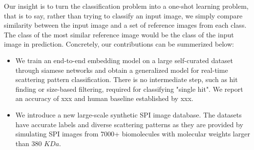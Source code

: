 Our insight is to turn the classification problem into a one-shot learning
problem, that is to say, rather than trying to classify an input image, we
simply compare similarity between the input image and a set of reference images
from each class.  The class of the most similar reference image would be the
class of the input image in prediction. Concretely, our contributions can be
summerized below:

\begin{itemize}

    \item We train an end-to-end embedding model on a large self-curated dataset
    through siamese networks and obtain a generalized model for real-time
    scattering pattern classification.  There is no intermediate step, such as
    hit finding or size-based filtering, required for classifying "single hit".
    We report an accuracy of {\color{red} xxx} and human baseline established by
    {\color{red} xxx}.  

    \item We introduce a new large-scale synthetic SPI image database.  The
    datasets have accurate labels and diverse scattering patterns as they are
    provided by simulating SPI images from {\color{red} 7000+} biomolecules with
    molecular weights larger than 380 $KDa$.  

\end{itemize}





